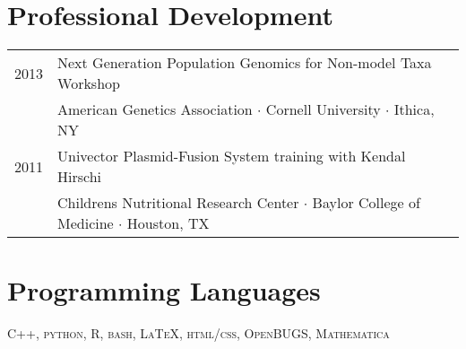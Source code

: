 \documentclass[11pt]{article}
\begin{document}
\section*{Professional Development}
\begin{tabularx}{\linewidth}{l X}
2013&Next Generation Population Genomics for Non-model Taxa Workshop\\
&American Genetics Association $\cdotp$ Cornell University $\cdotp$ Ithica, NY\\

2011& Univector Plasmid-Fusion System training with Kendal Hirschi\\
&Childrens Nutritional Research Center $\cdotp$ Baylor College of Medicine $\cdotp$ Houston, TX\\

\end{tabularx}
\section*{Programming Languages}
\textsc{C++, python, R, bash, \LaTeX, html/css, OpenBUGS, Mathematica}
\end{document}
